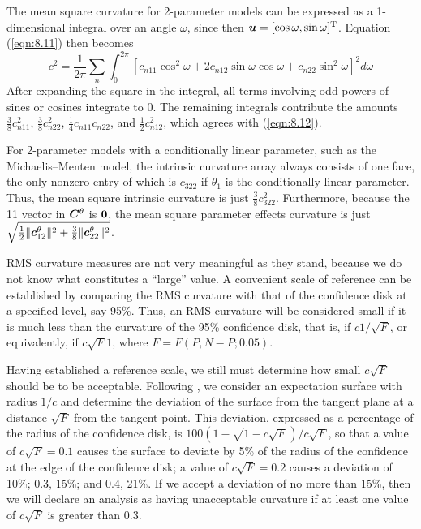 The mean square curvature for 2-parameter models can be
expressed as a 1-dimensional integral over an angle $\omega$,
since then $\bu = [ \cos\omega ,\sin\omega ] \trans$.
Equation (\ref{eqn:8.11}) then becomes
\begin{displaymath}
  c^2=\frac{1}{2\pi}
\sum_n { \int_0^{{2} \pi} {
\left[ c_{n11} \cos^2 \omega +
2 c_{n12} \sin  \omega  \cos  \omega +
c_{n22} \sin^2 \omega\right]^2 d \omega } }
\end{displaymath}
After expanding the square in the integral, all terms involving
odd powers of sines or cosines integrate to 0.
The remaining integrals contribute the amounts
$\frac{3}{8}c_{n11}^2 $, $\frac{3}{8}c_{n22}^2 $,
$\frac{1}{4}c_{n11} c_{n22}$, and $\frac{1}{2}c_{n12}^{2}$,
which agrees with (\ref{eqn:8.12}).

\begin{example}\label{mic:rms}

For 2-parameter models with a conditionally linear parameter,
such as the Michaelis--Menten model, the intrinsic curvature array
always consists of one face, the only nonzero entry of which is
$c_{322}$ if $\theta_{1}$ is the conditionally linear parameter.
Thus, the mean square intrinsic curvature is just
$\frac{3}{8}c_{322}^2 $.
Furthermore, because the 11 vector in ${\boldsymbol C}^{\theta}$ is $ {\bf 0} $, the
mean square parameter effects curvature is just
$\sqrt { \frac{1}{2} \| {\boldsymbol c}_{12}^{\theta} \|^2 +
\frac{3}{8} \| {\boldsymbol c}_{22}^{\theta} \|^2}$.
\end{example}

RMS curvature measures are not very meaningful as they
stand, because we do not know what constitutes a ``large''
value.
A convenient scale of reference can be established by comparing
the RMS curvature with that of the confidence disk
at a specified level, say 95\%.
Thus, an RMS curvature will be considered small if it is
much less than the curvature of the 95\% confidence disk,
that is, if
$c1 / \sqrt F$,
or equivalently, if $c \sqrt F  1$, where $F=F(P,N-P; 0.05 )$.

Having established a reference scale, we still must
determine how small $c \sqrt F$ should be to be acceptable.
Following , we consider an expectation
surface with radius $1/c$ and determine the
deviation of the surface from the tangent plane at a
distance $\sqrt F$ from the tangent point.
This deviation, expressed as a percentage of the radius of
the confidence disk, is
$100 ( 1 - \sqrt { 1 - c \sqrt F } ) / c \sqrt F$,
so that a value of $c \sqrt F =  0.1$ causes the surface to
deviate by 5\% of the radius of the confidence at the edge of
the confidence disk;
a value of $c \sqrt F =  0.2$ causes a deviation of
10\%; 0.3, 15\%; and 0.4, 21\%.
If we accept a deviation of no more than 15\%, then we will
declare an analysis as having unacceptable curvature if at least
one value of $c \sqrt F$ is greater than $0.3$.

